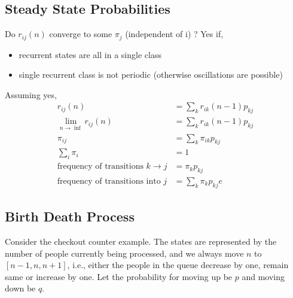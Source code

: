 \documentclass[11pt, a4paper]{article}
\begin{document}
    \subsection{Steady State Probabilities}
    Do $r_{ij}(n)$ converge to some $\pi_{j}$ (independent of i) ? \newline
    Yes if,
    \begin{itemize}
        \item recurrent states are all in a single class
        \item single recurrent class is not periodic (otherwise oscillations are possible)
    \end{itemize}
    Assuming yes,
    \begin{align*}
        r_{ij}(n) &= \sum_{k} r_{ik}(n-1)p_{kj}\\
        \lim_{n \to \inf} r_{ij}(n) &= \sum_{k} r_{ik}(n-1)p_{kj}\\
        \pi_{ij} &= \sum_{k} \pi_{ik} p_{kj} \tag*{balance equations} \\
        \sum_{i} \pi_{i} &= 1 \\
        \text{frequency of transitions $k \rightarrow j$} &= \pi_{k} p_{kj} \tag*{in one step}\\
        \text{frequency of transitions into $j$} &= \sum_{k} \pi_{k} p_{kj} \tag*{influx from all connected states}e
    \end{align*}

    \subsection{Birth Death Process}
    Consider the checkout counter example. The states are represented by the number of people currently being processed, and we always move $n$ to $[n-1, n, n+1]$, i.e., either the people in the queue decrease by one, remain same or increase by one. Let the probability for moving up be $p$ and moving down be $q$.
\end{document}
